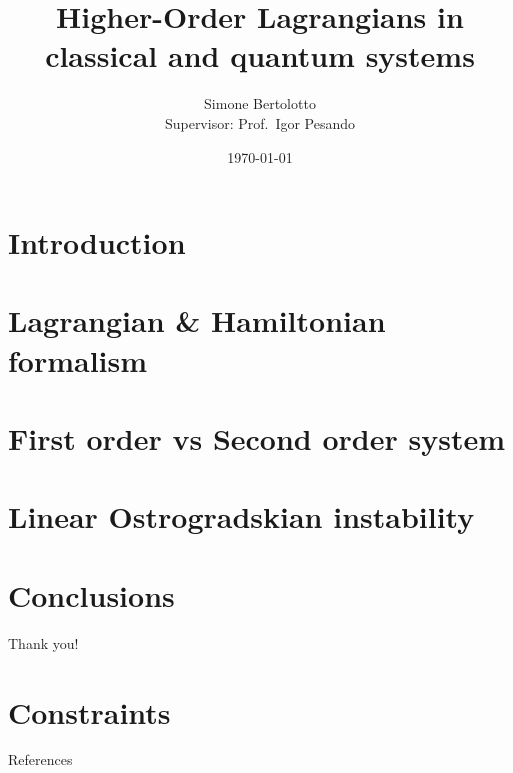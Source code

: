 \documentclass[10pt]{beamer}
\title{Higher-Order Lagrangians in classical and quantum systems}
\date{\today}
\author{Simone Bertolotto\\{\small Supervisor: Prof.\ Igor Pesando}}
\institute{Università degli studi di Torino --- Fisica}
\begin{document}
  \maketitle

  \section{Introduction}
  

  \section{Lagrangian \& Hamiltonian formalism}
  

  \section{First order vs Second order system}
  

  \section{Linear Ostrogradskian instability}
  

  \section{Conclusions}
  

  \begin{frame}[standout]
    Thank you!
  \end{frame}

  \appendix

  \section{Constraints}
  

  \begin{frame}[allowframebreaks]{References}
    
    
  \end{frame}
\end{document}
